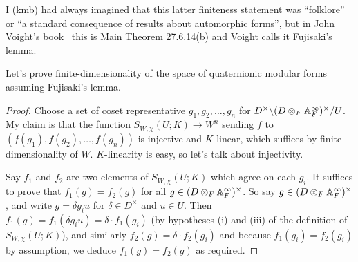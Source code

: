 I (kmb) had always imagined that this latter finiteness statement was ``folklore'' or
``a standard consequence of results about automorphic forms'', but in John Voight's
book~\cite{voight} this is Main Theorem 27.6.14(b) and Voight calls it Fujisaki’s lemma.

Let's prove finite-dimensionality of the space of quaternionic modular forms
assuming Fujisaki's lemma.
\begin{proof}
  Choose a set of coset representative $g_1,g_2,\ldots,g_n$ for
  $D^\times\backslash(D\otimes_F\mathbb{A}_F^\infty)^\times/U$. My claim is that
  the function $S_{W,\chi}(U;K)\to W^n$ sending $f$ to $(f(g_1),f(g_2),\ldots,f(g_n))$
  is injective and $K$-linear, which suffices by finite-dimensionality of $W$.
  $K$-linearity is easy, so let's talk about injectivity.

  Say $f_1$ and $f_2$ are two elements of $S_{W,\chi}(U;K)$ which agree on
  each $g_i$. It suffices to prove that $f_1(g)=f_2(g)$ for all
  $g\in(D\otimes_F\mathbb{A}_F^\infty)^\times$. So say $g\in(D\otimes_F\mathbb{A}_F^\infty)^\times$,
  and write $g=\delta g_iu$ for $\delta \in D^\times$ and $u\in U$.
  Then $f_1(g)=f_1(\delta g_iu)=\delta\cdot f_1(g_i)$ (by hypotheses (i) and (iii)
  of the definition of $S_{W,\chi}(U;K)$), and similarly $f_2(g)=\delta\cdot f_2(g_i)$
  and because $f_1(g_i)=f_2(g_i)$ by assumption, we deduce $f_1(g)=f_2(g)$ as required.
\end{proof}
